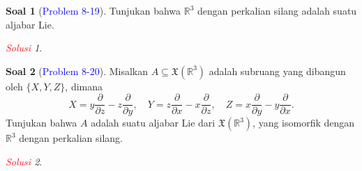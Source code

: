 \documentclass[11pt]{article}
\theoremstyle{definition}
\newtheorem*{problem}{Soal}
\theoremstyle{remark}
\newtheorem*{solution}{\textcolor{red}{Solusi}}
\newcommand{\er}{\mathbb{R}}            %
\begin{document}
\begin{problem}[\textcolor{blue}{Problem 8-19}]
Tunjukan bahwa $\er^3$ dengan perkalian silang adalah suatu aljabar Lie.
\end{problem}
\begin{solution}

\end{solution}

\begin{problem}[\textcolor{blue}{Problem 8-20}]
Misalkan $A \subseteq \mathfrak{X}(\er^3)$ adalah subruang yang dibangun oleh $\{X,Y,Z\}$, dimana
$$
X = y \frac{\partial}{\partial z} - z \frac{\partial}{\partial y}, \quad Y = z \frac{\partial}{\partial x} - x \frac{\partial}{\partial z}, \quad Z = x \frac{\partial}{\partial y} - y \frac{\partial}{\partial x}.  
$$
Tunjukan bahwa $A$ adalah suatu aljabar Lie dari $\mathfrak{X}(\er^3)$, yang isomorfik dengan $\er^3$ dengan perkalian silang. 
\end{problem}
\begin{solution}

\end{solution}
\end{document}
